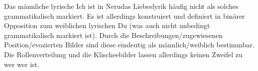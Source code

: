 Das männliche lyrische Ich ist in Nerudas Liebeslyrik häufig nicht als solches grammatikalisch markiert.
Es ist allerdings konstruiert und definiert in binärer Opposition zum weiblichen lyrischen Du (was auch nicht unbedingt grammatikalisch markiert ist).
Durch die Beschreibungen/zugewiesenen Position/evozierten Bilder sind diese eindeutig als männlich/weiblich bestimmbar.
Die Rollenverteilung und die Klischeebilder lassen allerdings keinen Zweifel zu wer wer ist.

\begin{comment}
4. Exemplarische Re-Vision einzelner Gedichte
   Tu risa, Poema XV
   * bestimmte Frauen- (und Männer-)bilder werden von den Gedichten konstruiert --> einseitig, problematisch, Macht
     ** abgesprochene Agenz; Frauen sind stumm, ohne eigenes Wesen; Ansammlung von (erotisierten) Körperteilen
   * Heteronormativität, Monogamie (2er-Beziehungen) als Teilungsstrategie des Kapitalismus
   * Duncan weist darauf hin, dass Kritiker Nerudas Liebeslyrik oftmals nur vom Standpunkt des männlichen Sprechers im Text aus betrachten, anstatt die Position der Geliebten in Betracht zu ziehen. Daraus resultiert eine einseitige und repetitive Verbreitung aus männlicher Perspektive, welche schon in den Gedichten selbst zum Vorschein kommt. Die weibliche Perspektive wurde bis auf wenige Ausnahmen systematisch ignoriert.
   * Der sexuellen Dialektik, welche sich unter der Oberfläche dieser Gedichte verbirgt, wurde bisher
   kaum Aufmerksamkeit gewidmet. Interessant: Sexismus kommt nicht so sehr in der Bildsprache
   Nerudas vor als in dem Lesen dieser Bilder ("Sexism does not reside so much in the actual images as in
   the reading of those images.") > Warum wird die passive und stille (oder still gehaltene) Frau in einer
   Machtposition gesehen, wenn doch ihre eigene Existenz von der ihres männlichen Liebhabers abhängt?
   Warum wird sie als dem Mann gleichgestellt betrachtet, wenn sie in den Texten als seine Untergebene
   porträtiert wird? Warum sprechen Kritiker von einem Dialog zwischen den Liebhabern, wenn der
   weibliche Teil nie versprachlicht wird (keine Stimme erhält)?"") %
   * Duncan erklärt weiterhin, dass unter dem Vorwand der Lobpreisung des Frauseins und dessen Einzigartigkeit, diese Einschätzungen über Nerudas Liebeslyrik textuelle Widersprüche vorenthalten, welche symptomatisch für die Unterdrückung der Frau in einer patriarchalen Kultur seien. Nur dadurch, dass die Frau zu einem Liebesobjekt wird, erwacht sie zu Leben. Ohne ihren männlichen Liebhaber ist sie “vacía, sin substancia“. Diese Darstellung der Frau in den Texten kontrastiert drastisch neben der des männlichen Sprechers, wessen Existenz nicht von der physischen Präsenz oder der weiblichen Liebe abhängig ist. Ohne ihre Liebe mag er sich verloren fühlen, aber seine Identität gerät nie in eine Krise, er sagt, ohne zu zögern, “todos saben quién soy“.

\end{comment}
